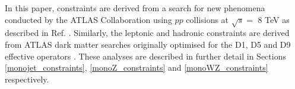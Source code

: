 In this paper, \monojet constraints are derived from a search for new phenomena conducted by the ATLAS Collaboration using $pp$ collisions at $\sqrt{s}=$ 8 TeV as described in Ref. \cite{Aad:2015zva}. Similarly, the leptonic \monoZ and hadronic \monoWZ constraints are derived from ATLAS dark matter searches originally optimised for the D1, D5 and D9 effective operators \cite{Aad:2014monoZlep, ATLASmonoWZ}. These analyses are described in further detail in Sections \ref{monojet_constraints}, \ref{monoZ_constraints} and \ref{monoWZ_constraints} respectively.


